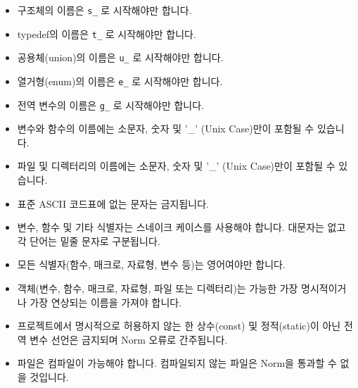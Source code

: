 \documentclass{42-ko}
\begin{document}
        \begin{itemize}

            \item 구조체의 이름은 \texttt{s\_} 로 시작해야만 합니다.

            \item typedef의 이름은 \texttt{t\_} 로 시작해야만 합니다.

            \item 공용체(union)의 이름은 \texttt{u\_} 로 시작해야만 합니다.

            \item 열거형(enum)의 이름은 \texttt{e\_} 로 시작해야만 합니다.

            \item 전역 변수의 이름은 \texttt{g\_} 로 시작해야만 합니다.

            \item 변수와 함수의 이름에는 소문자, 숫자 및
            '\_' (Unix Case)만이 포함될 수 있습니다.

            \item 파일 및 디렉터리의 이름에는 소문자, 숫자 및
            '\_' (Unix Case)만이 포함될 수 있습니다.

            \item 표준 ASCII 코드표에 없는 문자는 금지됩니다.

            \item 변수, 함수 및 기타 식별자는 스네이크 케이스를 사용해야 합니다.
                대문자는 없고 각 단어는 밑줄 문자로 구분됩니다.

            \item 모든 식별자(함수, 매크로, 자료형, 변수 등)는 영어여야만 합니다.

            \item 객체(변수, 함수, 매크로, 자료형, 파일 또는 디렉터리)는
                가능한 가장 명시적이거나 가장 연상되는 이름을 가져야 합니다.

            \item 프로젝트에서 명시적으로 허용하지 않는 한
                상수(const) 및 정적(static)이 아닌 전역 변수 선언은 금지되며
                Norm 오류로 간주됩니다.

            \item 파일은 컴파일이 가능해야 합니다. 컴파일되지 않는 파일은
                Norm을 통과할 수 없을 것입니다.
        \end{itemize}
\newpage

\end{document}
